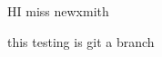 \documentclass[a4 paper,12pt]{article}
\begin{document}
HI  miss newxmith

this testing is git a branch
\end{document}
